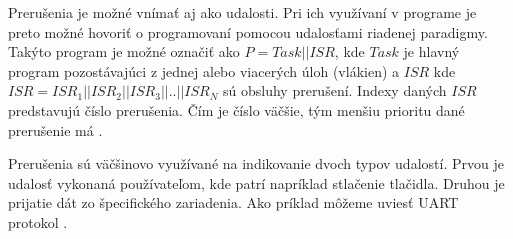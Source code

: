   \cite{regehrSafeStructuredUse2007} \par
Prerušenia je možné vnímať aj ako udalosti. Pri ich využívaní v programe je preto možné hovoriť o programovaní pomocou udalosťami riadenej paradigmy. Takýto program je možné označiť ako \begin{math}P=Task || ISR\end{math}, kde \begin{math}Task\end{math} je hlavný program pozostávajúci z jednej alebo viacerých úloh (vlákien) a  \begin{math}ISR\end{math} kde \begin{math}ISR=ISR_1||ISR_2||ISR_3||..||ISR_N\end{math} sú obsluhy prerušení.
Indexy daných \begin{math}ISR\end{math} predstavujú číslo prerušenia. Čím je číslo väčšie, tým menšiu prioritu dané prerušenie má \cite{wangAutomaticDetectionValidation2017}. \par Prerušenia sú väčšinovo využívané na indikovanie dvoch typov udalostí. Prvou je udalosť vykonaná používateľom, kde patrí napríklad stlačenie tlačidla. Druhou je prijatie dát zo špecifického zariadenia. Ako príklad môžeme uviesť UART protokol \cite{wangAutomaticDetectionValidation2017}.